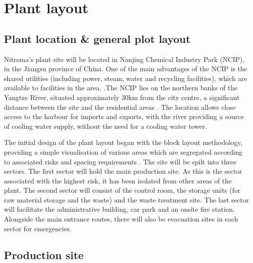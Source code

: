 \section{Plant layout}

\subsection{Plant location \& general plot layout}

Nitroma’s plant site will be located in Nanjing Chemical Industry Park (NCIP), in the Jiangsu province of China. One of the main advantages of the NCIP is the shared utilities (including power, steam, water and recycling facilities), which are available to facilities in the area. \cite{independent_commodity_intelligence_services_china_2007}.The NCIP lies on the northern banks of the Yangtze River, situated approximately 30km from the city centre, a significant distance between the site and the residential areas \cite{zeng_divergent_2011}. The location allows close access to the harbour for imports and exports, with the river providing a source of cooling water supply, without the need for a cooling water tower.    


The initial design of the plant layout began with the block layout methodology, providing a simple visualisation of various areas which are segregated according to associated risks and spacing requirements \cite{center_for_chemical_process_safety_site_2010}. The site will be spilt into three sectors. The first sector will hold the main production site. As this is the sector associated with the highest risk, it has been isolated from other areas of the plant. The second sector will consist of the control room, the storage units (for raw material storage and the waste) and the waste treatment site. The last sector will facilitate the administrative building, car park and an onsite fire station. Alongside the main entrance routes, there will also be evacuation sites in each sector for emergencies. 






\subsection{Production site}


